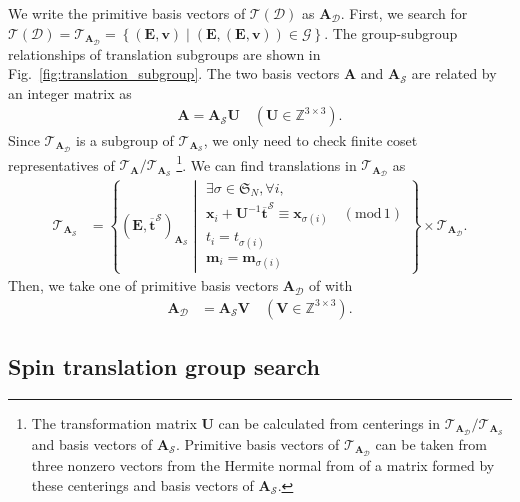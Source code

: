 \documentclass[a4paper, 11pt]{article}
\theoremstyle{definition}
\newcommand{\relmiddle}[1]{\mathrel{}\middle#1\mathrel{}}
\newcommand{\set}[2]{\left\{ #1 \relmiddle| #2 \right\}}
\begin{document}
We write the primitive basis vectors of $\mathcal{T}(\mathcal{D})$ as $\bm{A}_{\mathcal{D}}$.
First, we search for $\mathcal{T}(\mathcal{D}) = \mathcal{T}_{\bm{A}_{\mathcal{D}}} = \set{ (\bm{E}, \bm{v}) }{ (\bm{E}, (\bm{E}, \bm{v})) \in \mathcal{G} }$.
The group-subgroup relationships of translation subgroups are shown in Fig.~\ref{fig:translation_subgroup}.
The two basis vectors $\bm{A}$ and $\bm{A}_{\mathcal{S}}$ are related by an integer matrix as
\begin{align}
  \bm{A} = \bm{A}_{\mathcal{S}} \bm{U} \quad (\bm{U} \in \mathbb{Z}^{3 \times 3}).
\end{align}
Since $\mathcal{T}_{\bm{A}_{\mathcal{D}}}$ is a subgroup of $\mathcal{T}_{\bm{A}_{\mathcal{S}}}$, we only need to check finite coset representatives of $\mathcal{T}_{\bm{A}} / \mathcal{T}_{\bm{A}_{\mathcal{S}}}$ \footnote{
  The transformation matrix $\bm{U}$ can be calculated from centerings in $\mathcal{T}_{\bm{A}_{\mathcal{D}}} / \mathcal{T}_{\bm{A}_{\mathcal{S}}}$ and basis vectors of $\bm{A}_{\mathcal{S}}$.
  Primitive basis vectors of $\mathcal{T}_{\bm{A}_{\mathcal{D}}}$ can be taken from three nonzero vectors from the Hermite normal from of a matrix formed by these centerings and basis vectors of $\bm{A}_{\mathcal{S}}$.
}.
We can find translations in $\mathcal{T}_{\bm{A}_{\mathcal{D}}}$ as
\begin{align}
  \mathcal{T}_{\bm{A}_{\mathcal{S}}}
    &= \set{
      \left( \bm{E}, \overline{ \bm{t} }^{\mathcal{S}} \right)_{ \bm{A}_{\mathcal{S}} }
      }{
        \begin{array}{l}
          \exists \sigma \in \mathfrak{S}_{N}, \forall i, \\
          \bm{x}_{i} + \bm{U}^{-1} \overline{ \bm{t} }^{\mathcal{S}} \equiv \bm{x}_{\sigma(i)} \quad (\mathrm{mod}\, 1) \\
          t_{i} = t_{\sigma(i)} \\
          \bm{m}_{i} = \bm{m}_{\sigma(i)}
        \end{array}
      }
      \times \mathcal{T}_{\bm{A}_{\mathcal{D}}}.
\end{align}
Then, we take one of primitive basis vectors $\bm{A}_{\mathcal{D}}$ of with
\begin{align}
  \bm{A}_{\mathcal{D}}
    &= \bm{A}_{\mathcal{S}} \bm{V} \quad (\bm{V} \in \mathbb{Z}^{3 \times 3}).
\end{align}

\subsection{Spin translation group search}
\end{document}
